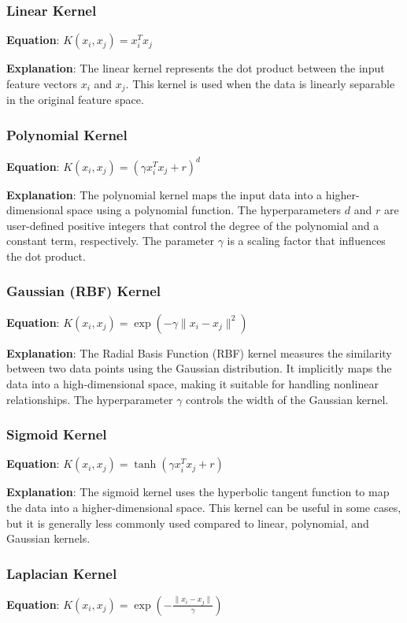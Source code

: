 \documentclass[12pt]{report}
\begin{document}
\subsubsection{Linear Kernel}
\textbf{Equation}: $K(x_i, x_j) = x_i^T x_j$

\textbf{Explanation}: The linear kernel represents the dot product between the input feature vectors $x_i$ and $x_j$. This kernel is used when the data is linearly separable in the original feature space.

\subsubsection{Polynomial Kernel}
\textbf{Equation}: $K(x_i, x_j) = (\gamma x_i^T x_j + r)^d$

\textbf{Explanation}: The polynomial kernel maps the input data into a higher-dimensional space using a polynomial function. The hyperparameters $d$ and $r$ are user-defined positive integers that control the degree of the polynomial and a constant term, respectively. The parameter $\gamma$ is a scaling factor that influences the dot product.

\subsubsection{Gaussian (RBF) Kernel}
\textbf{Equation}: $K(x_i, x_j) = \exp \left( -\gamma \|x_i - x_j\|^2 \right)$

\textbf{Explanation}: The Radial Basis Function (RBF) kernel measures the similarity between two data points using the Gaussian distribution. It implicitly maps the data into a high-dimensional space, making it suitable for handling nonlinear relationships. The hyperparameter $\gamma$ controls the width of the Gaussian kernel.

\subsubsection{Sigmoid Kernel}
\textbf{Equation}: $K(x_i, x_j) = \tanh(\gamma x_i^T x_j + r)$

\textbf{Explanation}: The sigmoid kernel uses the hyperbolic tangent function to map the data into a higher-dimensional space. This kernel can be useful in some cases, but it is generally less commonly used compared to linear, polynomial, and Gaussian kernels.

\subsubsection{Laplacian Kernel}
\textbf{Equation}: $K(x_i, x_j) = \exp \left( -\frac{\|x_i - x_j\|}{\gamma} \right)$
\end{document}
